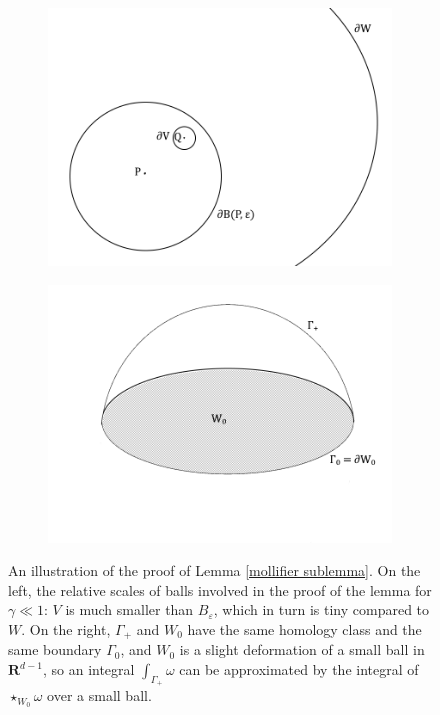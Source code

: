 \documentclass[reqno,10pt]{amsart}
\newcommand{\RR}{\mathbf{R}}
\theoremstyle{definition}
\numberwithin{equation}{section}
\begin{document}
\begin{figure}
\centering
\begin{subfigure}[b]{0.4\linewidth}
\includegraphics[width=\linewidth]{estimating_scales.png}
\end{subfigure}
\begin{subfigure}[b]{0.4\linewidth}
\includegraphics[width=\linewidth]{estimate homotopy.png}
\end{subfigure}
\caption{An illustration of the proof of Lemma \ref{mollifier sublemma}. On the left, the relative scales of balls involved in the proof of the lemma for $\gamma \ll 1$: $V$ is much smaller than $B_\varepsilon$, which in turn is tiny compared to $W$. On the right, $\Gamma_+$ and $W_0$ have the same homology class and the same boundary $\Gamma_0$, and $W_0$ is a slight deformation of a small ball in $\RR^{d - 1}$, so an integral $\int_{\Gamma_+} \omega$ can be approximated by the integral of $\star_{W_0} \omega$ over a small ball.}
\label{estimating figures}
\end{figure}
\end{document}
